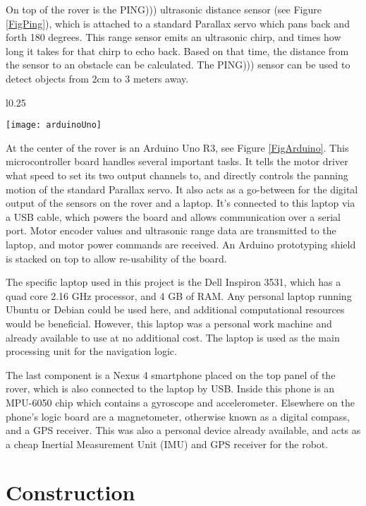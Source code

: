 On top of the rover is the PING))) ultrasonic distance sensor (see Figure \ref{FigPing}), which is attached to a standard Parallax servo which pans back and forth 180 degrees. This range sensor emits an ultrasonic chirp, and times how long it takes for that chirp to echo back. Based on that time, the distance from the sensor to an obstacle can be calculated. The PING))) sensor can be used to detect objects from 2cm to 3 meters away. \cite{pingDocumentation}

\begin{wrapfigure}{l}{0.25\textwidth}
	\caption{Arduino Uno R3 \cite{fig_arduino_uno}}
	\centering
	\texttt{[image: arduinoUno]}
	\label{FigArduino}
\end{wrapfigure}

At the center of the rover is an Arduino Uno R3, see Figure \ref{FigArduino}. This microcontroller board handles several important tasks. It tells the motor driver what speed to set its two output channels to, and directly controls the panning motion of the standard Parallax servo. It also acts as a go-between for the digital output of the sensors on the rover and a laptop. It's connected to this laptop via a USB cable, which powers the board and allows communication over a serial port. Motor encoder values and ultrasonic range data are transmitted to the laptop, and motor power commands are received. An Arduino prototyping shield is stacked on top to allow re-usability of the board.

The specific laptop used in this project is the Dell Inspiron 3531, which has a quad core 2.16 GHz processor, and 4 GB of RAM. Any personal laptop running Ubuntu or Debian could be used here, and additional computational resources would be beneficial. However, this laptop was a personal work machine and already available to use at no additional cost. The laptop is used as the main processing unit for the navigation logic.

The last component is a Nexus 4 smartphone placed on the top panel of the rover, which is also connected to the laptop by USB. Inside this phone is an MPU-6050 chip which contains a gyroscope and accelerometer. Elsewhere on the phone's logic board are a magnetometer, otherwise known as a digital compass, and a GPS receiver. This was also a personal device already available, and acts as a cheap Inertial Measurement Unit (IMU) and GPS receiver for the robot.

\section{Construction}

